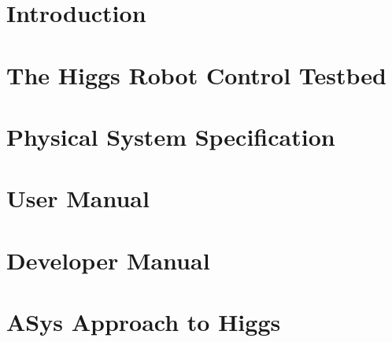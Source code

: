 \documentclass{aslreport}
\begin{document}
\tableofcontents

\chapter{Introduction}
\label{chapter:introduction}



\chapter{The Higgs Robot Control Testbed}



\chapter{Physical System Specification}




\chapter{User Manual}



\chapter{Developer Manual}




\chapter{ASys Approach to Higgs}
\label{chapter:asyshiggs}

\end{document}
